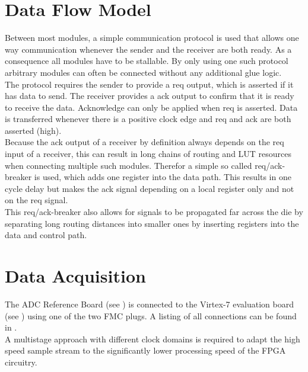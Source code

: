 \section{Data Flow Model}
\label{sec:fpga_reqack}
Between most modules, a simple communication protocol is used that allows
one way communication whenever the sender and the receiver are both
ready. As a consequence all modules have to be stallable. By only using
one such protocol arbitrary modules can often be connected
without any additional glue logic. \\

The protocol requires the sender to provide a \acrfull{req} output, which
is asserted if it has data to send. The receiver provides a \gls{ack}
output to confirm that it is ready to receive the data.
Acknowledge can only be applied when \gls{req} is asserted.
Data is transferred whenever there is a positive clock edge and
\gls{req} and \gls{ack} are both asserted (high). \\

Because the \gls{ack} output of a receiver by definition always depends on the
\gls{req} input of a receiver, this can result in long chains of routing and
\gls{LUT} resources when connecting multiple such modules.
Therefor a simple so called \gls{req}/\gls{ack}-breaker is used, which adds one
register into the data path. This results in one cycle delay but makes the
\gls{ack} signal depending on a local register only and not on the
\gls{req} signal. \\

This \gls{req}/\gls{ack}-breaker also allows for signals to be propagated
far across the die by separating long routing distances into smaller
ones by inserting registers into the data and control path. \\

\section{Data Acquisition}
\label{sec:fpga_adc}

The \gls{ADC} Reference Board (see ) is connected
to the Virtex-7 evaluation board (see )
using one of the two \gls{FMC} plugs.
A listing of all connections can be found in . \\

A multistage approach with different clock domains is required to adapt the
high speed sample stream to the significantly lower processing speed of the
\gls{FPGA} circuitry.  \\

